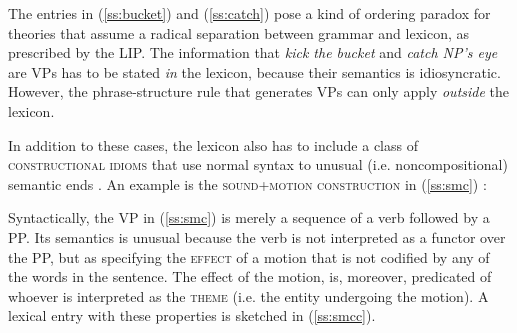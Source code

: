 \documentclass[output=paper,hidelinks]{langscibook}
\begin{document}
The entries in (\ref{ss:bucket}) and (\ref{ss:catch}) pose a kind of ordering paradox for theories that assume a radical separation between grammar and lexicon, as prescribed by the LIP. The information that \textit{kick the bucket} and \textit{catch NP's eye} are VPs has to be stated \textit{in} the lexicon, because their semantics is idiosyncratic. However, the phrase-structure rule that generates VPs can only apply \textit{outside} the lexicon.

In addition to these cases, the lexicon also has to include a class of \textsc{constructional idioms} that use normal syntax to unusual (i.e. noncompositional) semantic ends \citep{jackendoff1997the-architecture, jackendoff2002foundations}. An example is the \textsc{sound+motion construction} in (\ref{ss:smc}) \citep{levin1995unaccusativity, goldberg2004english}:

\begin{exe}
\label{ss:smc}
\end{exe}


Syntactically, the VP in (\ref{ss:smc}) is merely a sequence of a verb followed by a PP. Its semantics is unusual because the verb is not interpreted as a functor over the PP, but as specifying the \textsc{effect} of a motion that is not codified by any of the words in the sentence. The effect of the motion, is, moreover, predicated of whoever is interpreted as the \textsc{theme} (i.e. the entity undergoing the motion). A lexical entry with these properties is sketched in (\ref{ss:smcc}).


\end{document}

